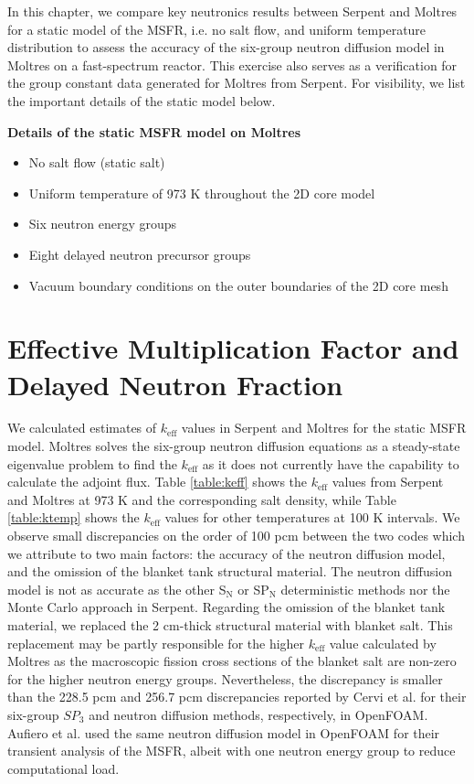 In this chapter, we compare key neutronics results between Serpent and Moltres
for a static model of the \gls{MSFR}, i.e. no salt flow, and uniform
temperature distribution to assess the accuracy of the
six-group neutron diffusion model in Moltres on a fast-spectrum reactor. This
exercise also serves as a verification for the group constant data
generated for Moltres from Serpent. For visibility, we list the important
details of the static model below.

\textbf{Details of the static \gls{MSFR} model on Moltres}
\begin{itemize}
    \item No salt flow (static salt)
    \item Uniform temperature of 973 K throughout the 2D core model
    \item Six neutron energy groups
    \item Eight delayed neutron precursor groups
    \item Vacuum boundary conditions on the outer boundaries of the 2D core
    mesh
\end{itemize}

\section{Effective Multiplication Factor and Delayed Neutron Fraction}

We calculated estimates of $k_{\text{eff}}$ values in Serpent and Moltres for
the static \gls{MSFR} model. Moltres solves the six-group neutron diffusion equations as a
steady-state eigenvalue problem to find the $k_{\text{eff}}$ as it does not
currently have the capability to calculate the adjoint flux. Table
\ref{table:keff} shows the $k_{\text{eff}}$ values from Serpent and Moltres at
973 K and the corresponding salt density, while Table \ref{table:ktemp} shows
the $k_{\text{eff}}$ values for other temperatures at 100 K intervals. We
observe small discrepancies on the order of 100 pcm between the two codes
which we attribute to two main factors: the accuracy of the neutron diffusion
model, and the omission of the blanket tank structural material. The neutron
diffusion model is not as accurate as the other S$_{\text{N}}$ or
SP$_{\text{N}}$ deterministic methods nor the Monte Carlo approach in Serpent.
Regarding the omission of the blanket tank material, we replaced the
2 cm-thick structural material with blanket salt. This replacement may be
partly responsible for the higher $k_{\text{eff}}$ value calculated by Moltres
as the macroscopic fission cross sections of the blanket salt are non-zero for
the higher neutron energy groups. Nevertheless, the discrepancy is smaller
than the 228.5 pcm and 256.7 pcm discrepancies reported by Cervi et al.
\cite{cervi_development_2019} for their six-group $SP_3$ and neutron
diffusion methods, respectively, in OpenFOAM. Aufiero et al.
\cite{aufiero_development_2014} used the same neutron diffusion model in
OpenFOAM for their transient analysis of the \gls{MSFR}, albeit with one
neutron energy group to reduce computational load.

